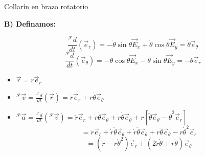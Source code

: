 \begin{solucion}{Collarín en brazo rotatorio}
\vspace{0.8cm}

\noindent\textbf{B) Definamos:}

\[
\frac{{}^{\mathcal{F}}d}{dt}(\vec{e}_r) = -\dot{\theta}\sin\theta \vec{E}_x + \dot{\theta}\cos\theta \vec{E}_y = \dot{\theta}\vec{e}_\theta
\]
\[
\frac{{}^{\mathcal{F}}d}{dt}(\vec{e}_\theta) = -\dot{\theta}\cos\theta \vec{E}_x - \dot{\theta}\sin\theta \vec{E}_y = -\dot{\theta}\vec{e}_r
\]

\begin{itemize}
    \item $\vec{r} = r\vec{e}_r$
    \item ${}^{\mathcal{F}}\vec{v} = \frac{{}^{\mathcal{F}}d}{dt}(\vec{r}) = \dot{r}\vec{e}_r + r\dot{\theta}\vec{e}_\theta$
    \item ${}^{\mathcal{F}}\vec{a} = \frac{{}^{\mathcal{F}}d}{dt}({}^{\mathcal{F}}\vec{v}) = \ddot{r}\vec{e}_r + \dot{r}\dot{\theta}\vec{e}_\theta + \dot{r}\dot{\theta}\vec{e}_\theta + r\left[\ddot{\theta}\vec{e}_\theta - \dot{\theta}^2\vec{e}_r\right]$
    \[
    = \ddot{r}\vec{e}_r + \dot{r}\dot{\theta}\vec{e}_\theta + \dot{r}\dot{\theta}\vec{e}_\theta + r\ddot{\theta}\vec{e}_\theta - r\dot{\theta}^2\vec{e}_r
    \]
    \[
    = (\ddot{r} - r\dot{\theta}^2)\vec{e}_r + (2\dot{r}\dot{\theta} + r\ddot{\theta})\vec{e}_\theta
    \]
\end{itemize}
\end{solucion}

